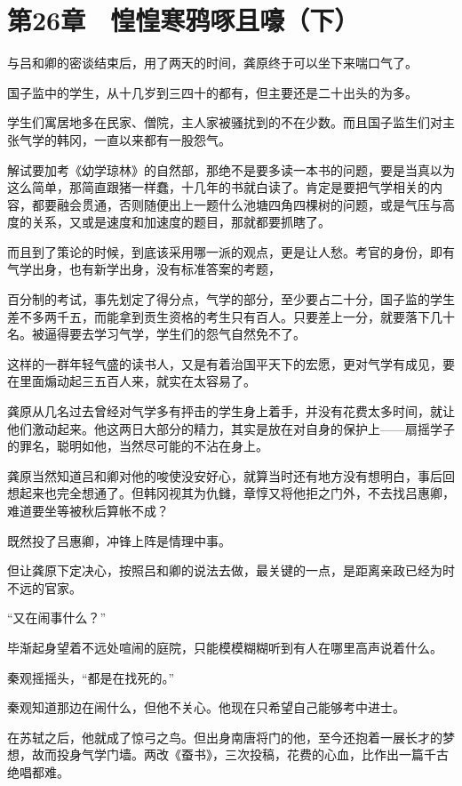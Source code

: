 \section{第26章　惶惶寒鸦啄且嚎（下）}

与吕和卿的密谈结束后，用了两天的时间，龚原终于可以坐下来喘口气了。

国子监中的学生，从十几岁到三四十的都有，但主要还是二十出头的为多。

学生们寓居地多在民家、僧院，主人家被骚扰到的不在少数。而且国子监生们对主张气学的韩冈，一直以来都有一股怨气。

解试要加考《幼学琼林》的自然部，那绝不是要多读一本书的问题，要是当真以为这么简单，那简直跟猪一样蠢，十几年的书就白读了。肯定是要把气学相关的内容，都要融会贯通，否则随便出上一题什么池塘四角四棵树的问题，或是气压与高度的关系，又或是速度和加速度的题目，那就都要抓瞎了。

而且到了策论的时候，到底该采用哪一派的观点，更是让人愁。考官的身份，即有气学出身，也有新学出身，没有标准答案的考题，

百分制的考试，事先划定了得分点，气学的部分，至少要占二十分，国子监的学生差不多两千五，而能拿到贡生资格的考生只有百人。只要差上一分，就要落下几十名。被逼得要去学习气学，学生们的怨气自然免不了。

这样的一群年轻气盛的读书人，又是有着治国平天下的宏愿，更对气学有成见，要在里面煽动起三五百人来，就实在太容易了。

龚原从几名过去曾经对气学多有抨击的学生身上着手，并没有花费太多时间，就让他们激动起来。他这两日大部分的精力，其实是放在对自身的保护上——扇摇学子的罪名，聪明如他，当然尽可能的不沾在身上。

龚原当然知道吕和卿对他的唆使没安好心，就算当时还有地方没有想明白，事后回想起来也完全想通了。但韩冈视其为仇雠，章惇又将他拒之门外，不去找吕惠卿，难道要坐等被秋后算帐不成？

既然投了吕惠卿，冲锋上阵是情理中事。

但让龚原下定决心，按照吕和卿的说法去做，最关键的一点，是距离亲政已经为时不远的官家。

“又在闹事什么？”

毕渐起身望着不远处喧闹的庭院，只能模模糊糊听到有人在哪里高声说着什么。

秦观摇摇头，“都是在找死的。”

秦观知道那边在闹什么，但他不关心。他现在只希望自己能够考中进士。

在苏轼之后，他就成了惊弓之鸟。但出身南唐将门的他，至今还抱着一展长才的梦想，故而投身气学门墙。两改《蚕书》，三次投稿，花费的心血，比作出一篇千古绝唱都难。

